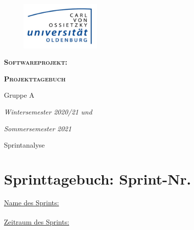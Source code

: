 \documentclass[12pt,a4paper, oneside]{article}
\author{Uni Oldenburg, SWP2020 Gruppe A}
\begin{document}
    \begin{titlepage}
        \pagestyle{empty}
        \begin{center}

            \begin{figure}[h]
                \centering
                \includegraphics[width=0.35\textwidth]{../img/Logo.jpg}
            \end{figure}

            \bigskip \bigskip \noindent
            \textsc{\textbf{\LARGE Softwareprojekt:}} \par \bigskip \noindent
            \textsc{\textbf{\LARGE Projekttagebuch}}


            \par \bigskip \bigskip \bigskip \bigskip \bigskip \noindent
            {\Large Gruppe A} \par \medskip \noindent

            \par \bigskip \bigskip \bigskip \bigskip \bigskip \bigskip \noindent
            \textit{\Large Wintersemester 2020/21 und} \par \noindent
            \textit{\Large Sommersemester 2021}

            \par \bigskip \bigskip \bigskip \bigskip \bigskip \bigskip \noindent
            \par \bigskip \bigskip \bigskip \noindent
            {\Large Sprintanalyse} \par \medskip \noindent

        \end{center}
    \end{titlepage}

    \tableofcontents
    \pagebreak


    \section{Sprinttagebuch: Sprint-Nr.}
    \underline{Name des Sprints:}
    \\

    \noindent
    \\
    \underline{Zeitraum des Sprints:}
    \\
\end{document}
